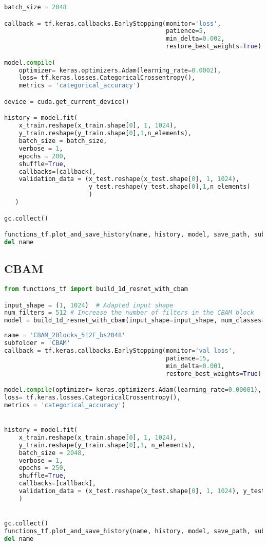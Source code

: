 \begin{lstlisting}[language=Python]
batch_size = 2048

callback = tf.keras.callbacks.EarlyStopping(monitor='loss', 
                                            patience=5, 
                                            min_delta=0.002,
                                            restore_best_weights=True)

model.compile(
    optimizer= keras.optimizers.Adam(learning_rate=0.0002),
    loss= tf.keras.losses.CategoricalCrossentropy(),
    metrics = 'categorical_accuracy')

device = cuda.get_current_device()

history = model.fit(
    x_train.reshape(x_train.shape[0], 1, 1024),
    y_train.reshape(y_train.shape[0],1,n_elements),
    batch_size = batch_size,
    verbose = 1,
    epochs = 200,
    shuffle=True,
    callbacks=[callback],
    validation_data = (x_test.reshape(x_test.shape[0], 1, 1024),
                       y_test.reshape(y_test.shape[0],1,n_elements)
                       )
   )

gc.collect()

functions_tf.plot_and_save_history(name, history, model, save_path, subfolder=subfolder)
del name
\end{lstlisting}

\hypertarget{cbam}{%
\subsection*{CBAM}\label{cbam}}

\begin{lstlisting}[language=Python]
from functions_tf import build_1d_resnet_with_cbam

input_shape = (1, 1024)  # Adapted input shape
num_filters = 512 # Increase the number of filters in the CBAM block
model = build_1d_resnet_with_cbam(input_shape=input_shape, num_classes=n_elements, num_filters=num_filters, output_shape=(1, 81), res_block_num=2)
\end{lstlisting}

\begin{lstlisting}[language=Python]
name = 'CBAM_2Blocks_512F_bs2048'
subfolder = 'CBAM'
callback = tf.keras.callbacks.EarlyStopping(monitor='val_loss', 
                                            patience=15,
                                            min_delta=0.001,
                                            restore_best_weights=True)

model.compile(optimizer= keras.optimizers.Adam(learning_rate=0.00001),
loss= tf.keras.losses.CategoricalCrossentropy(),
metrics = 'categorical_accuracy')


history = model.fit(
    x_train.reshape(x_train.shape[0], 1, 1024),
    y_train.reshape(y_train.shape[0],1, n_elements),
    batch_size = 2048,
    verbose = 1,
    epochs = 250,
    shuffle=True,
    callbacks=[callback],
    validation_data = (x_test.reshape(x_test.shape[0], 1, 1024), y_test.reshape(y_test.shape[0],1, n_elements))
    )


gc.collect()
functions_tf.plot_and_save_history(name, history, model, save_path, subfolder=subfolder)
del name
\end{lstlisting}

